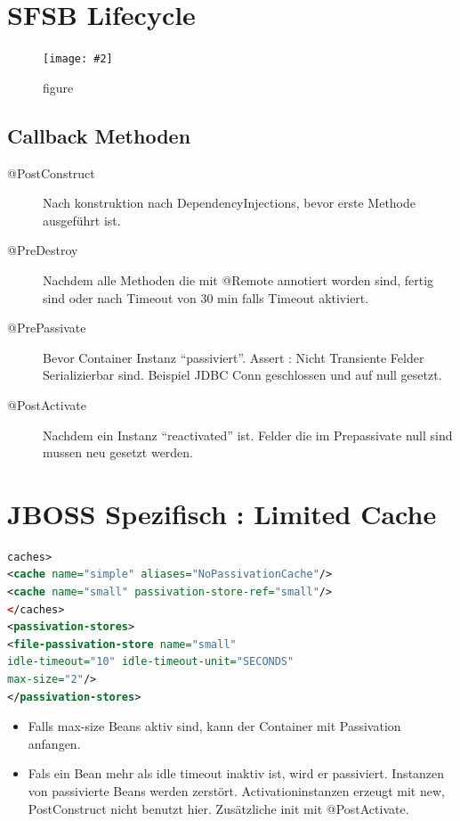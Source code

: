\documentclass[a4paper,10pt]{scrreprt}
\newcommand{\pic}[2][figure]{\begin{figure}[h]
 \centering
 \texttt{[image: \#2]}
 \caption{#1}
\end{figure}
}
\begin{document}
\section{SFSB Lifecycle}
\pic{sfsbl.png}

\subsection{Callback Methoden}
\begin{description}
 \item [@PostConstruct] Nach konstruktion nach DependencyInjections, bevor erste Methode ausgeführt ist.
 \item [@PreDestroy] Nachdem alle Methoden die mit @Remote annotiert worden sind, fertig sind oder nach Timeout von 30 
min falls Timeout aktiviert.
\item [@PrePassivate] Bevor Container Instanz ``passiviert''. Assert : Nicht Transiente Felder Serializierbar sind. 
Beispiel JDBC Conn geschlossen und auf null gesetzt.
\item[@PostActivate] Nachdem ein Instanz ``reactivated'' ist. Felder die im Prepassivate null sind mussen neu gesetzt 
werden.

\end{description}

\section{JBOSS Spezifisch : Limited Cache}
\begin{lstlisting}[caption=Limited Cache,language=xml]
 caches>
<cache name="simple" aliases="NoPassivationCache"/>
<cache name="small" passivation-store-ref="small"/>
</caches>
<passivation-stores>
<file-passivation-store name="small"
idle-timeout="10" idle-timeout-unit="SECONDS"
max-size="2"/>
</passivation-stores>
\end{lstlisting}
\begin{itemize}
 \item Falls max-size Beans aktiv sind, kann der Container mit  Passivation anfangen.
 \item Fals ein Bean mehr als idle timeout inaktiv ist, wird er passiviert.
 \subitem Instanzen von passivierte Beans werden zerstört.
  \subitem Activationinstanzen erzeugt mit new, PostConstruct nicht benutzt hier.
  \subitem Zusätzliche init mit @PostActivate.
\end{itemize}
\end{document}
